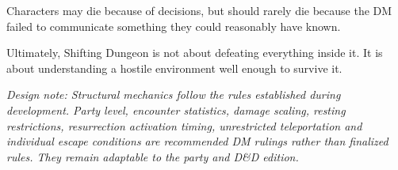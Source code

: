 Characters may die because of decisions, but should rarely die because the DM failed to communicate something they could reasonably have known.

Ultimately, Shifting Dungeon is not about defeating everything inside it. It is about understanding a hostile environment well enough to survive it.

{\small\itshape Design note: Structural mechanics follow the rules established during development. Party level, encounter statistics, damage scaling, resting restrictions, resurrection activation timing, unrestricted teleportation and individual escape conditions are recommended DM rulings rather than finalized rules. They remain adaptable to the party and D\&D edition.\par}

